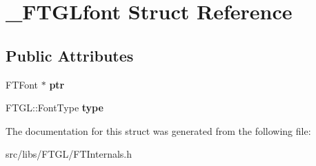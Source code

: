 \hypertarget{struct___f_t_g_lfont}{
\section{\_\-FTGLfont Struct Reference}
\label{struct___f_t_g_lfont}
}
\subsection*{Public Attributes}
\begin{DoxyCompactItemize}
\item 
\hypertarget{struct___f_t_g_lfont_a8bc834719ce209cd1ecc385b75e363b2}{
FTFont $\ast$ {\bfseries ptr}}
\label{struct___f_t_g_lfont_a8bc834719ce209cd1ecc385b75e363b2}

\item 
\hypertarget{struct___f_t_g_lfont_a1809096d837d4099e0470aa83a061ada}{
FTGL::FontType {\bfseries type}}
\label{struct___f_t_g_lfont_a1809096d837d4099e0470aa83a061ada}

\end{DoxyCompactItemize}


The documentation for this struct was generated from the following file:\begin{DoxyCompactItemize}
\item 
src/libs/FTGL/FTInternals.h\end{DoxyCompactItemize}
